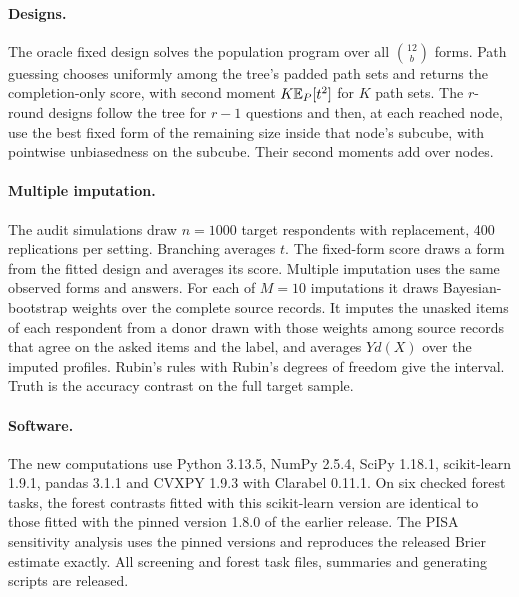 \paragraph{Designs.}
The oracle fixed design solves the population program over all $\binom{12}b$ forms. Path guessing chooses uniformly among the tree's padded path sets and returns the completion-only score, with second moment $K\mathbb{E}_P[t^2]$ for $K$ path sets. The $r$-round designs follow the tree for $r-1$ questions and then, at each reached node, use the best fixed form of the remaining size inside that node's subcube, with pointwise unbiasedness on the subcube. Their second moments add over nodes.



\paragraph{Multiple imputation.}
The audit simulations draw $n=1000$ target respondents with replacement, 400 replications per setting. Branching averages $t$. The fixed-form score draws a form from the fitted design and averages its score. Multiple imputation uses the same observed forms and answers. For each of $M=10$ imputations it draws Bayesian-bootstrap weights over the complete source records. It imputes the unasked items of each respondent from a donor drawn with those weights among source records that agree on the asked items and the label, and averages $Yd(X)$ over the imputed profiles. Rubin's rules with Rubin's degrees of freedom give the interval. Truth is the accuracy contrast on the full target sample.



\paragraph{Software.}
The new computations use Python 3.13.5, NumPy 2.5.4, SciPy 1.18.1, scikit-learn 1.9.1, pandas 3.1.1 and CVXPY 1.9.3 with Clarabel 0.11.1. On six checked forest tasks, the forest contrasts fitted with this scikit-learn version are identical to those fitted with the pinned version 1.8.0 of the earlier release. The PISA sensitivity analysis uses the pinned versions and reproduces the released Brier estimate exactly. All screening and forest task files, summaries and generating scripts are released.
